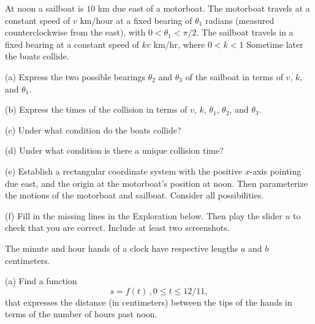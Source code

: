 \documentclass{ximera}
\begin{document}
\begin{question} \label{Q2:SineCosine}
At noon a sailboat is $10$ km due east of a motorboat. The motorboat travels at a constant speed of $v$ km/hour at a fixed bearing of $\theta_1$ radians (measured counterclockwise from the east), with $0<\theta_1 <\pi/2$. The sailboat travels in a fixed bearing at a constant speed of $kv$ km/hr, where $0<k<1$ Sometime later the boats collide.

(a) Express the two possible bearings $\theta_2$ and $\theta_3$ of the sailboat in terms of $v$, $k$, and $\theta_1$.

(b) Express the times of the collision in terms of $v$, $k$, $\theta_1$, $\theta_2$, and $\theta_3$.

(c) Under what condition do the boats collide?

(d) Under what condition is there a unique collision time?

(e) Establish a rectangular coordinate system with the positive $x$-axis pointing due east, and the origin at the motorboat's position at noon. Then parameterize the motions of the motorboat and sailboat. Consider all possibilities.

(f) Fill in the missing lines in the Exploration below. Then play the slider $u$ to check that you are correct. Include at least two screenshots.

\begin{exploration}

 
\begin{onlineOnly}
    \begin{center}
\end{center}
\end{onlineOnly}
\end{exploration} 

\end{question}


\begin{question} \label{Q3:SineCosine}
The minute and hour hands of a clock have respective lengths $a$ and $b$ centimeters.

(a) Find a function 
\[
   s = f(t) \, , 0\leq t \leq 12/11 ,
\]
that expresses the distance (in centimeters) between the tips of the hands in terms of the number of hours past noon.

\end{question}
\end{document}
